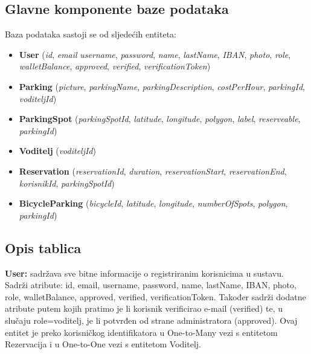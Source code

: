 \subsection{Glavne komponente baze podataka}
Baza podataka sastoji se od sljedećih entiteta:

\begin{itemize}
	\item \textbf{User} \hspace{0.15cm} (\textit{id}, \textit{email} \textit{username}, \textit{password}, \textit{name}, \textit{lastName}, \textit{IBAN}, \textit{photo}, \textit{role}, \textit{walletBalance}, \textit{approved}, \textit{verified}, \textit{verificationToken})
	
	
	\item \textbf{Parking} (\textit{picture}, \textit{parkingName}, \textit{parkingDescription}, \textit{costPerHour}, \textit{parkingId}, \textit{voditeljId}) 
	
	\item \textbf{ParkingSpot} (\textit{parkingSpotId}, \textit{latitude}, \textit{longitude}, \textit{polygon}, \textit{label}, \textit{reserveable}, \textit{parkingId})
	
	\item \textbf{Voditelj} (\textit{voditeljId})
	
	\item \textbf{Reservation} (\textit{reservationId}, \textit{duration}, \textit{reservationStart}, \textit{reservationEnd}, \textit{korisnikId}, \textit{parkingSpotId})
	
	\item \textbf{BicycleParking} (\textit{bicycleId}, \textit{latitude}, \textit{longitude}, \textit{numberOfSpots}, \textit{polygon}, \textit{parkingId})
\end{itemize}




\subsection{Opis tablica}





\textbf{User:} sadržava sve bitne informacije o registriranim korisnicima u sustavu. Sadrži atribute: id, email, username, password, name, lastName, IBAN, photo, role, walletBalance, approved, verified, verificationToken. Također sadrži dodatne atribute putem kojih pratimo je li korisnik verificirao e-mail (verified) te, u slučaju
role=voditelj, je li potvrđen od strane administratora (approved).
Ovaj entitet je preko korisničkog identifikatora u One-to-Many vezi s entitetom Rezervacija i u One-to-One vezi s entitetom Voditelj.

